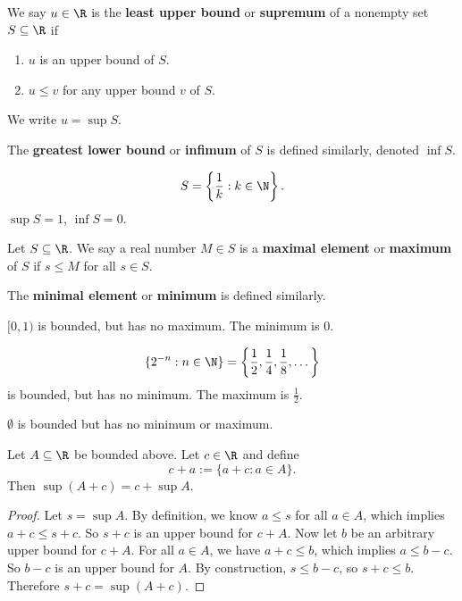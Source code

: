 \begin{definition}
  We say $u \in \R$ is the \textbf{least upper bound}
  or \textbf{supremum} of a nonempty set $S \subseteq \R$
  if
  \begin{enumerate}
    \item $u$ is an upper bound of $S$.
    \item $u \le v$ for any upper bound $v$ of $S$.
  \end{enumerate}
  We write $u = \sup S$.
\end{definition}

The \textbf{greatest lower bound} or \textbf{infimum}
of $S$ is defined similarly, denoted $\inf S$.

\begin{tcolorbox}
  \[S = \left\{\frac{1}{k} : k \in \N\right\}.\]
  $\sup S = 1$,  $\inf S = 0$.
\end{tcolorbox}

\begin{definition}
  Let $S \subseteq \R$. We say a real number
  $M \in S$ is a \textbf{maximal element} or
  \textbf{maximum} of $S$ if $s \le M$ for all
  $s \in S$.
\end{definition}

The \textbf{minimal element} or \textbf{minimum}
is defined similarly.

\begin{tcolorbox}
  $[0, 1)$ is bounded, but has no maximum. The minimum is
  $0$.
\end{tcolorbox}

\begin{tcolorbox}
  \[\{2^{-n} : n \in \N\} = \left\{\frac{1}{2}, \frac{1}{4}, \frac{1}{8}, \dots\right\}\]
  is bounded, but has no minimum. The maximum is
  $\frac{1}{2}$.
\end{tcolorbox}

\begin{tcolorbox}
  $\emptyset$ is bounded but has no minimum or maximum.
\end{tcolorbox}

\begin{exercise}
  Let $A \subseteq \R$ be bounded above. Let  $c \in \R$
  and define
  \[c + a := \{a + c : a \in A\}.\]
  Then  $\sup (A + c) = c + \sup A$.
\end{exercise}

\begin{proof}
  Let $s = \sup A$. By definition, we know  $a \le s$
  for all  $a \in A$, which implies
  $a + c \le s + c$. So $s + c$ is an upper bound
  for $c + A$.
  Now let  $b$ be an arbitrary upper bound
  for $c + A$.  For all $a \in A$, we have
  $a + c \le b$, which implies $a \le b - c$. So
  $b - c$ is an upper bound for  $A$. By construction,
  $s \le b - c$, so $s + c \le b$. Therefore
  $s + c = \sup (A + c)$.
\end{proof}

